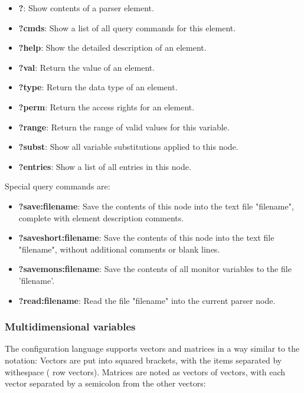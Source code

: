 \begin{itemize}
\item {\bf ?}: Show contents of a parser element.
\item {\bf ?cmds}: Show a list of all query commands for this element.
\item {\bf ?help}: Show the detailed description of an element.
\item {\bf ?val}: Return the value of an element.
\item {\bf ?type}: Return the data type of an element.
\item {\bf ?perm}: Return the access rights for an element.
\item {\bf ?range}: Return the range of valid values for this variable.
\item {\bf ?subst}: Show all variable substitutions applied to this node.
\item {\bf ?entries}: Show a list of all entries in this node.
\end{itemize}

Special query commands are:
%
%
%
%

\begin{itemize}
\item {\bf ?save:filename}: Save the contents of this node into the
text file "filename", complete with element description comments.
\item {\bf ?saveshort:filename}: Save the contents of this node into the
text file "filename", without additional comments or blank lines.
\item {\bf ?savemons:filename}: Save the contents of all monitor variables to
  the file 'filename'.
\item {\bf ?read:filename}: Read the file "filename" into the current
parser node.
\end{itemize}

\subsubsection{Multidimensional variables}%
%
%

The \mha{} configuration language supports vectors and matrices in a way similar
to the \Matlab{} notation: Vectors are put into squared brackets, with
the items separated by withespace (\Matlab{} row vectors). Matrices are
noted as vectors of vectors, with each vector separated by a semicolon
from the other vectors:

